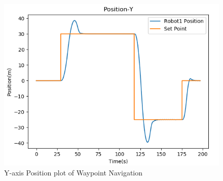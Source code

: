 \documentclass[10pt]{beamer}
\begin{document}
\begin{frame}
\begin{minipage}{0.47\textwidth}
\begin{figure}[h!]
			\includegraphics[scale=0.27]{Position-Y-single.png}
			\caption{Y-axis Position plot of Waypoint Navigation}
			\label{Fig:pos_y}
		\end{figure}
	\end{minipage}
\end{frame}
\end{document}
